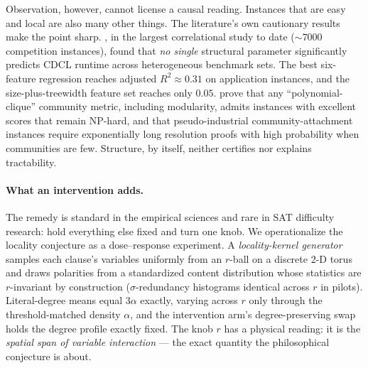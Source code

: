 \documentclass[manuscript, screen, review]{jair}
\begin{document}
Observation, however, cannot license a causal reading. Instances that are easy
and local are also many other things. The literature's own cautionary results
make the point sharp. \citet{zulkoski2018}, in the largest
correlational study to date (${\sim}7000$ competition instances), found that
\emph{no single} structural parameter significantly predicts CDCL runtime
across heterogeneous benchmark sets. The best six-feature regression reaches
adjusted $R^2 \approx 0.31$ on application instances, and the
size-plus-treewidth feature set reaches only $0.05$. \citet{mull2016} prove that
any ``polynomial-clique'' community metric, including modularity, admits
instances with excellent scores that remain \textsc{NP}-hard, and that
pseudo-industrial community-attachment instances require exponentially long
resolution proofs with high probability when communities are few. Structure,
by itself, neither certifies nor explains tractability.

\paragraph{What an intervention adds.}
The remedy is standard in the empirical sciences and rare in SAT difficulty
research: hold everything else fixed and turn one knob. We operationalize the
locality conjecture as a dose--response experiment. A \emph{locality-kernel
generator} samples each clause's variables uniformly from an $r$-ball on a
discrete 2-D torus and draws polarities from a standardized content
distribution whose statistics are $r$-invariant by construction
($\sigma$-redundancy histograms identical across $r$ in pilots). Literal-degree
means equal $3\alpha$ exactly, varying across $r$ only through the
threshold-matched density $\alpha$, and the intervention arm's
degree-preserving swap holds the degree profile exactly fixed. The knob $r$ has a physical
reading: it is the \emph{spatial span of variable interaction} --- the exact
quantity the philosophical conjecture is about.
\end{document}
